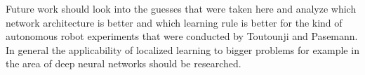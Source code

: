 \documentclass[12pt,twoside]{scrartcl}
\theoremstyle{plain}
\theoremstyle{definition}
\theoremstyle{remark}
\begin{document}
Future work should look into the guesses that were taken here and analyze which
network architecture is better and which learning rule is better for the kind of
autonomous robot experiments that were conducted by Toutounji and Pasemann. In
general the applicability of localized learning to bigger problems for example
in the area of deep neural networks should be researched.

%
%
\newpage
\printbibliography
{}%
\end{document}
